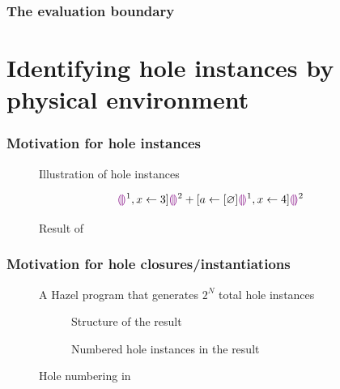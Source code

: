 \documentclass{beamer}
\begin{document}
\begin{frame}
  \frametitle{The evaluation boundary}

\end{frame}

\section{Identifying hole instances by physical environment}

\begin{frame}
  \frametitle{Motivation for hole instances}

  \begin{figure}
    \caption{Illustration of hole instances}
    \label{fig:instance-illustration}
  \end{figure}

  \begin{figure}
    \centering
    \begin{equation*}
      [a\leftarrow[\varnothing]\hehole^1,x\leftarrow 3]\hehole^2
      + [a\leftarrow[\varnothing]\hehole^1,x\leftarrow 4]\hehole^2
    \end{equation*}
    \caption{Result of }
    \label{fig:hole-instance-result}
  \end{figure}
\end{frame}

\begin{frame}[allowframebreaks]
  \frametitle{Motivation for hole closures/instantiations}

  \begin{figure}
    \centering
    \caption{A Hazel program that generates $2^N$ total hole instances}
    \label{fig:hole-renumbering-problem}
  \end{figure}

  \begin{figure}
    \centering
    \begin{subfigure}[b]{0.3\textwidth}
      \centering
      \maxsizebox{\textwidth}{10em}{
        
      }
      \caption{Structure of the result}
      \label{fig:hole-renumbering-solution-structure}
    \end{subfigure}
    \qquad
    \begin{subfigure}[b]{0.6\textwidth}
      \centering
      \maxsizebox{\textwidth}{10em}{
        
      }
      \caption{Numbered hole instances in the result}
      \label{fig:hole-renumbered-result}
    \end{subfigure}
    \caption{Hole numbering in }
  \end{figure}
\end{frame}
\end{document}
